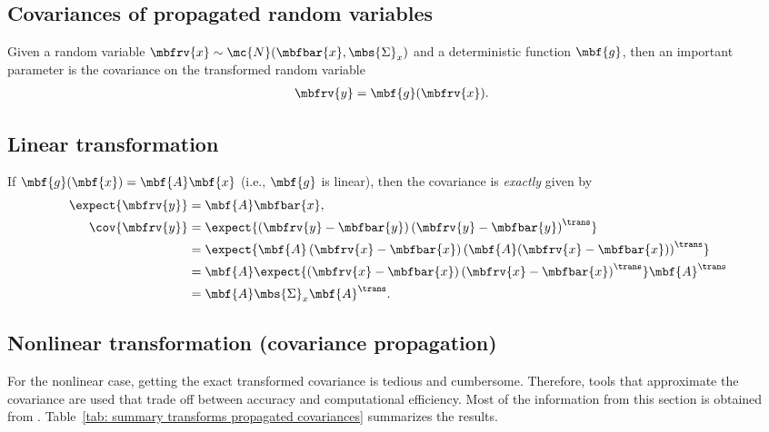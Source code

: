 \subsection{Covariances of propagated random variables}
Given a random variable $\mbfrv{x}\sim\mc{N}(\mbfbar{x},\mbs{\Sigma}_{x})$ and a deterministic function $\mbf{g}$, then an important parameter is the covariance on the transformed random variable
\begin{align}
    \mbfrv{y} &= \mbf{g}(\mbfrv{x}).
\end{align}

\subsection{Linear transformation}
If $\mbf{g}(\mbf{x})=\mbf{A}\mbf{x}$ (i.e., $\mbf{g}$ is linear), then the covariance is \emph{exactly} given by
\begin{align}
    \expect{\mbfrv{y}} &= \mbf{A}\mbfbar{x},\\
    \cov{\mbfrv{y}} &= \expect{\left(\mbfrv{y}-\mbfbar{y}\right)\left(\mbfrv{y}-\mbfbar{y}\right)^{\trans}}\\
    &= \expect{\mbf{A}\left(\mbfrv{x}-\mbfbar{x}\right)\left(\mbf{A}(\mbfrv{x}-\mbfbar{x})\right)^{\trans}}\\
    &= \mbf{A}\expect{\left(\mbfrv{x}-\mbfbar{x}\right)\left(\mbfrv{x}-\mbfbar{x}\right)^{\trans}}\mbf{A}^{\trans}\\
    &= \mbf{A}\mbs{\Sigma}_{x}\mbf{A}^{\trans}.
\end{align}

\subsection{Nonlinear transformation (covariance propagation)}
For the nonlinear case, getting the exact transformed covariance is tedious and cumbersome. Therefore, tools that approximate the covariance are used that trade off between accuracy and computational efficiency. Most of the information from this section is obtained from \cite{gustafsson_nonlinear_2008}. Table~\ref{tab: summary transforms propagated covariances} summarizes the results.

